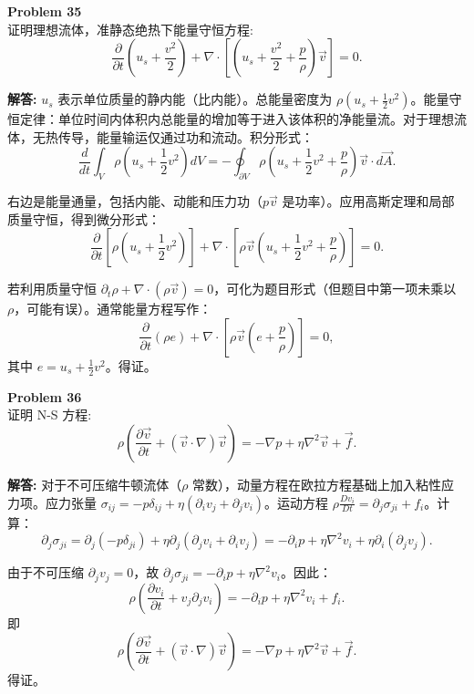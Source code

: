 \documentclass[12pt, a4paper, oneside]{ctexart}
\newenvironment{solution}{\par\noindent\textbf{解答:}\quad}{\par}
\begin{document}
\begin{mdframed}[backgroundcolor=gray!10, linewidth=0pt]
    \textbf{Problem 35} \\
    证明理想流体，准静态绝热下能量守恒方程:
    \[
    \frac{\partial}{\partial t} \left( u_s + \frac{v^2}{2} \right) + \nabla \cdot \left[ \left( u_s + \frac{v^2}{2} + \frac{p}{\rho} \right) \vec{v} \right] = 0.
    \]
\end{mdframed}
\begin{solution}
    \(u_s\) 表示单位质量的静内能（比内能）。总能量密度为 \(\rho (u_s + \frac{1}{2} v^2)\)。能量守恒定律：单位时间内体积内总能量的增加等于进入该体积的净能量流。对于理想流体，无热传导，能量输运仅通过功和流动。积分形式：
    \[
    \frac{d}{dt} \int_V \rho \left( u_s + \frac{1}{2} v^2 \right) dV = - \oint_{\partial V} \rho \left( u_s + \frac{1}{2} v^2 + \frac{p}{\rho} \right) \vec{v} \cdot d\vec{A}.
    \]
    
    右边是能量通量，包括内能、动能和压力功（\(p \vec{v}\) 是功率）。应用高斯定理和局部质量守恒，得到微分形式：
    \[
    \frac{\partial}{\partial t} \left[ \rho \left( u_s + \frac{1}{2} v^2 \right) \right] + \nabla \cdot \left[ \rho \vec{v} \left( u_s + \frac{1}{2} v^2 + \frac{p}{\rho} \right) \right] = 0.
    \]
    
    若利用质量守恒 \(\partial_t \rho + \nabla \cdot (\rho \vec{v}) = 0\)，可化为题目形式（但题目中第一项未乘以 \(\rho\)，可能有误）。通常能量方程写作：
    \[
    \frac{\partial}{\partial t} (\rho e) + \nabla \cdot \left[ \rho \vec{v} \left( e + \frac{p}{\rho} \right) \right] = 0,
    \]
    其中 \(e = u_s + \frac{1}{2} v^2\)。得证。
\end{solution}

\begin{mdframed}[backgroundcolor=gray!10, linewidth=0pt]
    \textbf{Problem 36} \\
    证明 N-S 方程:
    \[
    \rho \left( \frac{\partial \vec{v}}{\partial t} + (\vec{v} \cdot \nabla) \vec{v} \right) = -\nabla p + \eta \nabla^2 \vec{v} + \vec{f}.
    \]
\end{mdframed}
\begin{solution}
    对于不可压缩牛顿流体（\(\rho\) 常数），动量方程在欧拉方程基础上加入粘性应力项。应力张量 \(\sigma_{ij} = -p \delta_{ij} + \eta (\partial_i v_j + \partial_j v_i)\)。运动方程 \(\rho \frac{D v_i}{D t} = \partial_j \sigma_{ji} + f_i\)。计算：
    \[
    \partial_j \sigma_{ji} = \partial_j (-p \delta_{ji}) + \eta \partial_j (\partial_j v_i + \partial_i v_j) = -\partial_i p + \eta \nabla^2 v_i + \eta \partial_i (\partial_j v_j).
    \]
    
    由于不可压缩 \(\partial_j v_j = 0\)，故 \(\partial_j \sigma_{ji} = -\partial_i p + \eta \nabla^2 v_i\)。因此：
    \[
    \rho \left( \frac{\partial v_i}{\partial t} + v_j \partial_j v_i \right) = -\partial_i p + \eta \nabla^2 v_i + f_i.
    \]
    即
    \[
    \rho \left( \frac{\partial \vec{v}}{\partial t} + (\vec{v} \cdot \nabla) \vec{v} \right) = -\nabla p + \eta \nabla^2 \vec{v} + \vec{f}.
    \]
    得证。
\end{solution}
\end{document}
